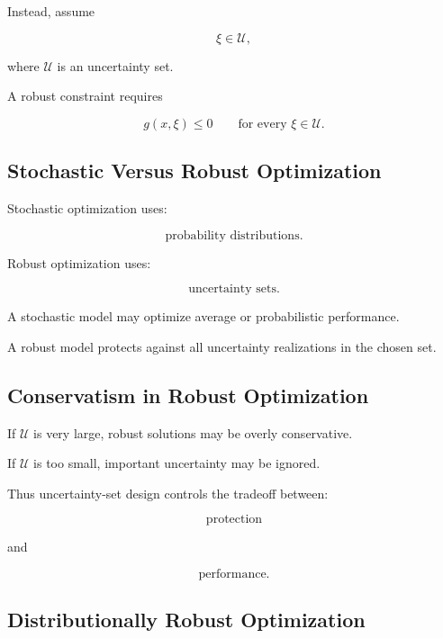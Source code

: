 Instead, assume

\[
\boxed{
\xi\in\mathcal{U},
}
\]

where \(\mathcal{U}\) is an uncertainty set.

A robust constraint requires

\[
\boxed{
g(x,\xi)\leq0
\qquad
\text{for every }
\xi\in\mathcal{U}.
}
\]

\subsection{Stochastic Versus Robust Optimization}
\label{subsec:stochastic-versus-robust}

Stochastic optimization uses:

\[
\boxed{
\text{probability distributions}.
}
\]

Robust optimization uses:

\[
\boxed{
\text{uncertainty sets}.
}
\]

A stochastic model may optimize average or probabilistic performance.

A robust model protects against all uncertainty realizations in the chosen
set.

\subsection{Conservatism in Robust Optimization}
\label{subsec:robust-conservatism}

If \(\mathcal{U}\) is very large, robust solutions may be overly
conservative.

If \(\mathcal{U}\) is too small, important uncertainty may be ignored.

Thus uncertainty-set design controls the tradeoff between:

\[
\boxed{
\text{protection}
}
\]

and

\[
\boxed{
\text{performance}.
}
\]

\subsection{Distributionally Robust Optimization}
\label{subsec:distributionally-robust-optimization}

